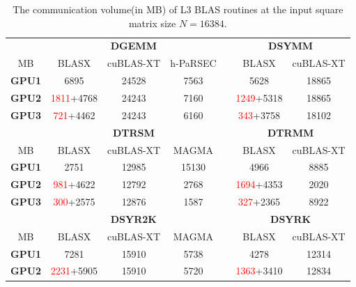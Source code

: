 \documentclass[conference]{IEEEtran}
\begin{document}
\setlength{\tabcolsep}{4.5pt}
\begin{table}[t]
\centering
\caption{The communication volume(in MB) of L3 BLAS routines at the input square matrix size $N = 16384$.}
\label{communication_volume}
\begin{tabular}{c c c c c c c}
    \toprule
    \setlength{\tabcolsep}{1em}
    & \multicolumn{3}{c}{\textbf{DGEMM}} & & \multicolumn{2}{c}{\textbf{DSYMM}} \\
    \cline{2-4}  \cline{6-7}
    MB             &      BLASX                 &  cuBLAS-XT & h-PaRSEC  & &   BLASX                          &  cuBLAS-XT  \\  \midrule
    \textbf{GPU1}  &       6895                 &    24528   &      7563 & &   5628                           &    18865         \\
    \textbf{GPU2}  & \textcolor{red}{1811}+4768 &    24243   &      7160 & &   \textcolor{red}{1249}+5318     &    18865         \\
    \textbf{GPU3}  & \textcolor{red}{721}+4462  &    24243   &      6160 & &   \textcolor{red}{343}+3758      &    18102         \\
    \bottomrule
    & \multicolumn{3}{c}{\textbf{DTRSM}} & & \multicolumn{2}{c}{\textbf{DTRMM}} \\
    \cline{2-4}  \cline{6-7}
    MB             &      BLASX                  &  cuBLAS-XT &    MAGMA  & & BLASX                           &  cuBLAS-XT  \\  \midrule
    \textbf{GPU1}  &     2751                    &    12985   &    15130  & &   4966                          &  8885       \\
    \textbf{GPU2}  & \textcolor{red}{981}+4622   &    12792   &    2768   & &   \textcolor{red}{1694}+4353    &  2020       \\
    \textbf{GPU3}  & \textcolor{red}{300}+2575   &    12876   &    1587   & &   \textcolor{red}{327}+2365     &  8922       \\
    \bottomrule
    & \multicolumn{3}{c}{\textbf{DSYR2K}} & & \multicolumn{2}{c}{\textbf{DSYRK}} \\
    \cline{2-4}  \cline{6-7}
    MB             &      BLASX                 &  cuBLAS-XT &    MAGMA & &  BLASX                       &  cuBLAS-XT  \\  \midrule
    \textbf{GPU1}  &       7281                 &    15910   &    5738  & &   4278                       &  12314      \\
    \textbf{GPU2}  & \textcolor{red}{2231}+5905 &    15910   &    5720  & &   \textcolor{red}{1363}+3410 &  12834      \\

\end{tabular}
\end{table}
\end{document}
